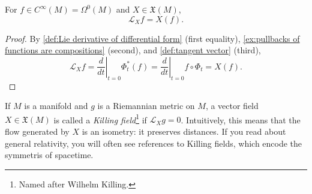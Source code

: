 \begin{lemma}\label{lem:Lie derivative of function}
	For $f \in C^\infty(M) = \Omega^0(M)$ and $X \in \mathfrak{X}(M)$, 
	\[
		\mathcal{L}_Xf = X(f).
	\]
\end{lemma}

\begin{proof}
	By \cref{def:Lie derivative of differential form} (first equality), \cref{ex:pullbacks of functions are compositions} (second), and \cref{def:tangent vector} (third), 
	\[
		\mathcal{L}_Xf = \left. \frac{d}{dt}\right|_{t=0} \Phi_t^\ast(f) = \left. \frac{d}{dt}\right|_{t=0} f \circ \Phi_t = X(f).
	\]
\end{proof}

\begin{example}
	If $M$ is a manifold and $g$ is a Riemannian metric on $M$, a vector field $X \in \mathfrak{X}(M)$ is called a \emph{Killing field}\footnote{Named after Wilhelm Killing.} if $\mathcal{L}_Xg = 0$. Intuitively, this means that the flow generated by $X$ is an isometry: it preserves distances. If you read about general relativity, you will often see references to Killing fields, which encode the symmetris of spacetime.
	

\end{example}
